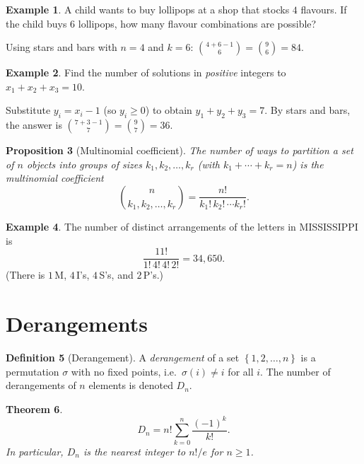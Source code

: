 \documentclass[12pt,a4paper,openany]{book}
\theoremstyle{definition}
\newtheorem{definition}{Definition}[chapter]
\newtheorem{example}[definition]{Example}
\theoremstyle{plain}
\newtheorem{theorem}[definition]{Theorem}
\newtheorem{proposition}[definition]{Proposition}
\theoremstyle{remark}
\newcommand{\set}[1]{\left\{#1\right\}}
\begin{document}
\begin{example}\label{ex:stars-bars-coins}
A child wants to buy lollipops at a shop that stocks $4$ flavours. If the
child buys $6$ lollipops, how many flavour combinations are possible?

Using stars and bars with $n = 4$ and $k = 6$:
$\binom{4 + 6 - 1}{6} = \binom{9}{6} = 84$.
\end{example}

\begin{example}\label{ex:positive-solutions}
Find the number of solutions in \emph{positive} integers to
$x_1 + x_2 + x_3 = 10$.

Substitute $y_i = x_i - 1$ (so $y_i \geq 0$) to obtain
$y_1 + y_2 + y_3 = 7$. By stars and bars, the answer is
$\binom{7 + 3 - 1}{7} = \binom{9}{7} = 36$.
\end{example}

\begin{proposition}[Multinomial coefficient]\label{prop:multinomial}
The number of ways to partition a set of $n$ objects into groups of sizes
$k_1, k_2, \ldots, k_r$ (with $k_1 + \cdots + k_r = n$) is the
\emph{multinomial coefficient}
\[
  \binom{n}{k_1, k_2, \ldots, k_r} = \frac{n!}{k_1!\, k_2!\, \cdots k_r!}.
\]
\end{proposition}

\begin{example}\label{ex:anagram}
The number of distinct arrangements of the letters in \textsc{MISSISSIPPI}
is
\[
  \frac{11!}{1!\,4!\,4!\,2!} = 34{,}650.
\]
(There is $1$\,M, $4$\,I's, $4$\,S's, and $2$\,P's.)
\end{example}

\section{Derangements}
\label{sec:derangements}

\begin{definition}[Derangement]\label{def:derangement}
A \emph{derangement} of a set $\set{1, 2, \ldots, n}$ is a permutation
$\sigma$ with no fixed points, i.e.\ $\sigma(i) \neq i$ for all $i$.
The number of derangements of $n$ elements is denoted $D_n$.
\end{definition}

\begin{theorem}\label{thm:derangement-formula}
\[
  D_n = n!\sum_{k=0}^{n}\frac{(-1)^k}{k!}.
\]
In particular, $D_n$ is the nearest integer to $n!/e$ for $n \geq 1$.
\end{theorem}
\end{document}
